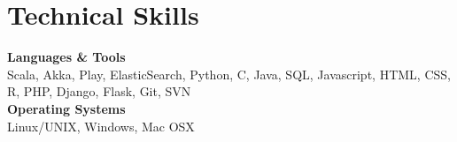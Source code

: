 \documentclass[letterpaper]{article}
\begin{document}
  \section{Technical Skills}

    \noindent\textbf{Languages \& Tools} \\
    Scala, Akka, Play, ElasticSearch, Python, C, Java, SQL, Javascript, HTML, CSS, R, PHP, Django, Flask, Git, SVN \\

    \noindent\textbf{Operating Systems} \\
    Linux/UNIX, Windows, Mac OSX


\end{document}
